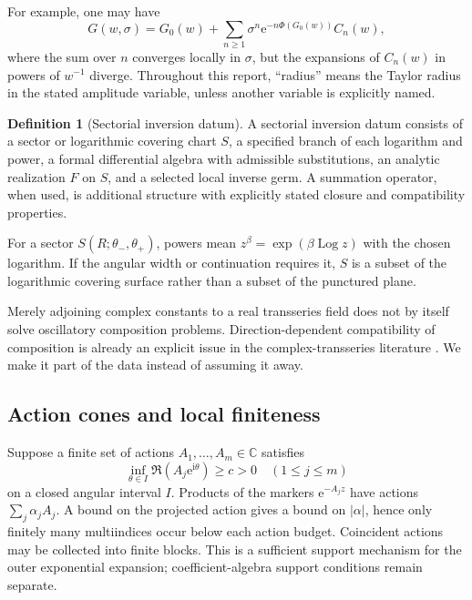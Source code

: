 \documentclass[11pt,a4paper]{article}
\numberwithin{equation}{section}
\theoremstyle{definition}
\newtheorem{definition}[definition]{Definition}
\theoremstyle{remark}
\newcommand{\C}{\mathbb C}
\newcommand{\e}{\mathrm e}
\newcommand{\ii}{\mathrm i}
\newcommand{\Log}{\operatorname{Log}}
\begin{document}
For example, one may have
\begin{equation}
 G(w,\sigma)=G_0(w)+\sum_{n\geq1}\sigma^n\e^{-n\Phi(G_0(w))}C_n(w),
 \label{eq:two-layers}
\end{equation}
where the sum over $n$ converges locally in $\sigma$, but the expansions of $C_n(w)$ in powers of $w^{-1}$ diverge. Throughout this report, ``radius'' means the Taylor radius in the stated amplitude variable, unless another variable is explicitly named.

\begin{definition}[Sectorial inversion datum]
A sectorial inversion datum consists of a sector or logarithmic covering chart $S$, a specified branch of each logarithm and power, a formal differential algebra with admissible substitutions, an analytic realization $F$ on $S$, and a selected local inverse germ. A summation operator, when used, is additional structure with explicitly stated closure and compatibility properties.
\end{definition}

For a sector $S(R;\theta_-,\theta_+)$, powers mean $z^\beta=\exp(\beta\Log z)$ with the chosen logarithm. If the angular width or continuation requires it, $S$ is a subset of the logarithmic covering surface rather than a subset of the punctured plane.

Merely adjoining complex constants to a real transseries field does not by itself solve oscillatory composition problems. Direction-dependent compatibility of composition is already an explicit issue in the complex-transseries literature \cite{vdh-complex}. We make it part of the data instead of assuming it away.

\subsection{Action cones and local finiteness}
Suppose a finite set of actions $A_1,\ldots,A_m\in\C$ satisfies
\begin{equation}
 \inf_{\theta\in I}\Re(A_j\e^{\ii\theta})\geq c>0
 \quad(1\leq j\leq m)
 \label{eq:cone}
\end{equation}
on a closed angular interval $I$. Products of the markers $\e^{-A_jz}$ have actions $\sum_j\alpha_jA_j$. A bound on the projected action gives a bound on $|\alpha|$, hence only finitely many multiindices occur below each action budget. Coincident actions may be collected into finite blocks. This is a sufficient support mechanism for the outer exponential expansion; coefficient-algebra support conditions remain separate.
\end{document}
